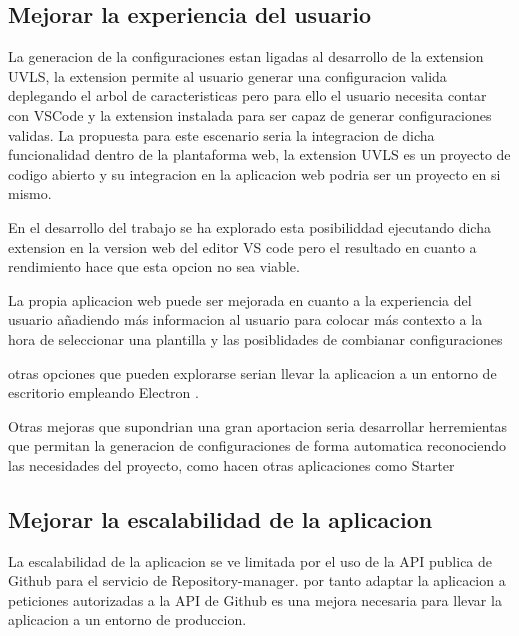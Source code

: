 \documentclass[12pt, a4paper, twoside]{article}
\begin{document}
\subsection{Mejorar la experiencia del usuario }
La generacion de la configuraciones estan ligadas al desarrollo de la extension UVLS, la extension permite al usuario generar una configuracion valida deplegando el arbol de caracteristicas pero para ello el usuario
necesita contar con VSCode y la extension instalada para ser capaz de generar configuraciones validas. La propuesta para este escenario seria la integracion de dicha funcionalidad dentro de la plantaforma web,
la extension UVLS es un proyecto de codigo abierto y su integracion en la aplicacion web podria ser un proyecto en si mismo. 

En el desarrollo del trabajo se ha explorado esta posibiliddad ejecutando dicha extension en la version
web del editor VS code pero el resultado en cuanto a rendimiento hace que esta opcion no sea viable.

La propia aplicacion web puede ser mejorada en cuanto a la experiencia del usuario añadiendo más informacion al usuario para colocar más contexto a la hora de seleccionar una plantilla y las posiblidades de combianar configuraciones 

otras opciones que pueden explorarse serian llevar la aplicacion a un entorno de escritorio empleando Electron \cite{electron}.

Otras mejoras que supondrian una gran aportacion seria desarrollar herremientas que permitan la generacion de configuraciones de forma automatica reconociendo las necesidades del proyecto, como hacen otras aplicaciones como Starter \cite{starter}

\subsection{Mejorar la escalabilidad de la aplicacion}
La escalabilidad de la aplicacion se ve limitada por el uso de la API publica de Github para el servicio de Repository-manager.
por tanto adaptar la aplicacion a peticiones autorizadas a la API de Github es una mejora necesaria para llevar la aplicacion a un entorno de produccion.
\end{document}
